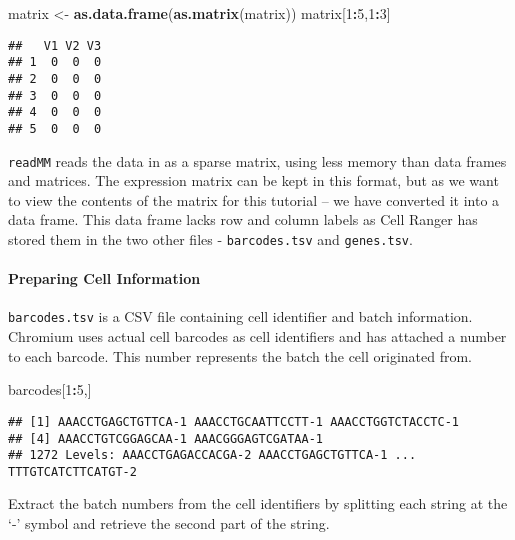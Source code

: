 \documentclass[]{article}
\newenvironment{Shaded}{\begin{snugshade}}{\end{snugshade}}
\newcommand{\DecValTok}[1]{\textcolor[rgb]{0.00,0.00,0.81}{#1}}
\newcommand{\KeywordTok}[1]{\textcolor[rgb]{0.13,0.29,0.53}{\textbf{#1}}}
\newcommand{\NormalTok}[1]{#1}
\newcommand{\OperatorTok}[1]{\textcolor[rgb]{0.81,0.36,0.00}{\textbf{#1}}}
\newcommand{\StringTok}[1]{\textcolor[rgb]{0.31,0.60,0.02}{#1}}
\let\oldparagraph\paragraph
\renewcommand{\paragraph}[1]{\oldparagraph{#1}\mbox{}}
\begin{document}
\begin{Shaded}
\begin{Highlighting}[]
\NormalTok{matrix <-}\StringTok{ }\KeywordTok{as.data.frame}\NormalTok{(}\KeywordTok{as.matrix}\NormalTok{(matrix))}
\NormalTok{matrix[}\DecValTok{1}\OperatorTok{:}\DecValTok{5}\NormalTok{,}\DecValTok{1}\OperatorTok{:}\DecValTok{3}\NormalTok{]}
\end{Highlighting}
\end{Shaded}

\begin{verbatim}
##   V1 V2 V3
## 1  0  0  0
## 2  0  0  0
## 3  0  0  0
## 4  0  0  0
## 5  0  0  0
\end{verbatim}

\texttt{readMM} reads the data in as a sparse matrix, using less memory
than data frames and matrices. The expression matrix can be kept in this
format, but as we want to view the contents of the matrix for this
tutorial -- we have converted it into a data frame. This data frame
lacks row and column labels as Cell Ranger has stored them in the two
other files - \texttt{barcodes.tsv} and \texttt{genes.tsv}.

\hypertarget{preparing-cell-information}{%
\paragraph{Preparing Cell
Information}\label{preparing-cell-information}}

\texttt{barcodes.tsv} is a CSV file containing cell identifier and batch
information. Chromium uses actual cell barcodes as cell identifiers and
has attached a number to each barcode. This number represents the batch
the cell originated from.

\begin{Shaded}
\begin{Highlighting}[]
\NormalTok{barcodes[}\DecValTok{1}\OperatorTok{:}\DecValTok{5}\NormalTok{,]}
\end{Highlighting}
\end{Shaded}

\begin{verbatim}
## [1] AAACCTGAGCTGTTCA-1 AAACCTGCAATTCCTT-1 AAACCTGGTCTACCTC-1
## [4] AAACCTGTCGGAGCAA-1 AAACGGGAGTCGATAA-1
## 1272 Levels: AAACCTGAGACCACGA-2 AAACCTGAGCTGTTCA-1 ... TTTGTCATCTTCATGT-2
\end{verbatim}

Extract the batch numbers from the cell identifiers by splitting each
string at the `-' symbol and retrieve the second part of the string.
\end{document}
